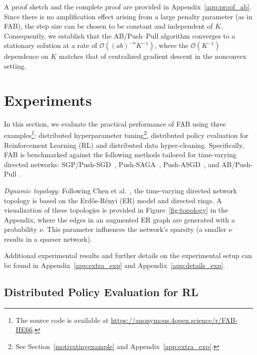 \documentclass{article}
\theoremstyle{plain}
\theoremstyle{definition}
\theoremstyle{remark}
\begin{document}
A proof sketch and the complete proof are provided in Appendix~\ref{app:proof_ab}. 
Since there is no amplification effect arising from a large penalty parameter (as in FAB), the step size can be chosen to be constant and independent of $K$. Consequently, we establish that the AB/Push–Pull algorithm converges to a stationary solution at a rate of $\mathcal{O}((ab)^{-n} K^{-1})$, where the $\mathcal{O}(K^{-1})$ dependence on $K$ matches that of centralized gradient descent in the nonconvex setting.  

\section{Experiments}

In this section, we evaluate the practical performance of FAB using three examples\footnote{The source code is available at \url{https://anonymous.4open.science/r/FAB-HE66}.}: distributed hyperparameter tuning\footnote{See Section~\ref{motivatingexample} and Appendix~\ref{app:extra_exp}.}, distributed policy evaluation for Reinforcement Learning (RL) and distributed data hyper-cleaning. 
Specifically, FAB is benchmarked against the following methods tailored for time-varying directed networks: SGP/Push-SGD~\cite{nedicSGP2016,AssranSGP2019}, Push-SAGA~\cite{QureshiPushsaga2025}, Push-ASGD~\cite{Chen2025asgd}, and AB/Push-Pull~\cite{Usman2020tv,Nedic2025tvd}.

\textit{Dynamic topology:} 
Following Chen et al.~, the time-varying directed network topology is based on the Erd\H{o}s-R\'enyi (ER) model and directed rings. 
A visualization of these topologies is provided in Figure~\ref{fig:topology} in the Appendix, where the edges in an augmented ER graph are generated with a probability $\nu$. This parameter influences the network’s sparsity (a smaller $\nu$ results in a sparser network).

Additional experimental results and further details on the experimental setup can be found in Appendix~\ref{app:extra_exp} and Appendix~\ref{app:details_exp}.


\subsection{Distributed Policy Evaluation for RL}
\end{document}
